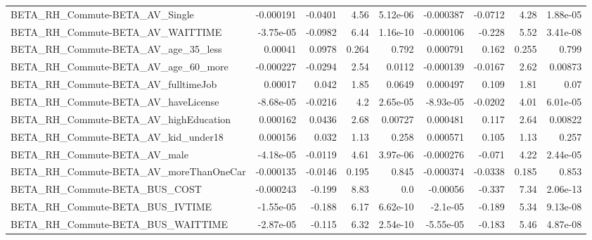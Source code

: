 \begin{tabular}{lrrrrrrrr}
BETA\_RH\_Commute-BETA\_AV\_Single                     &   -0.000191 &      -0.0401 &      4.56 & 5.12e-06 &  -0.000387 &     -0.0712 &         4.28 &      1.88e-05 \\
BETA\_RH\_Commute-BETA\_AV\_WAITTIME                   &   -3.75e-05 &      -0.0982 &      6.44 & 1.16e-10 &  -0.000106 &      -0.228 &         5.52 &      3.41e-08 \\
BETA\_RH\_Commute-BETA\_AV\_age\_35\_less                &     0.00041 &       0.0978 &     0.264 &    0.792 &   0.000791 &       0.162 &        0.255 &         0.799 \\
BETA\_RH\_Commute-BETA\_AV\_age\_60\_more                &   -0.000227 &      -0.0294 &      2.54 &   0.0112 &  -0.000139 &     -0.0167 &         2.62 &       0.00873 \\
BETA\_RH\_Commute-BETA\_AV\_fulltimeJob                &     0.00017 &        0.042 &      1.85 &   0.0649 &   0.000497 &       0.109 &         1.81 &          0.07 \\
BETA\_RH\_Commute-BETA\_AV\_haveLicense                &   -8.68e-05 &      -0.0216 &       4.2 & 2.65e-05 &  -8.93e-05 &     -0.0202 &         4.01 &      6.01e-05 \\
BETA\_RH\_Commute-BETA\_AV\_highEducation              &    0.000162 &       0.0436 &      2.68 &  0.00727 &   0.000481 &       0.117 &         2.64 &       0.00822 \\
BETA\_RH\_Commute-BETA\_AV\_kid\_under18                &    0.000156 &        0.032 &      1.13 &    0.258 &   0.000571 &       0.105 &         1.13 &         0.257 \\
BETA\_RH\_Commute-BETA\_AV\_male                       &   -4.18e-05 &      -0.0119 &      4.61 & 3.97e-06 &  -0.000276 &      -0.071 &         4.22 &      2.44e-05 \\
BETA\_RH\_Commute-BETA\_AV\_moreThanOneCar             &   -0.000135 &      -0.0146 &     0.195 &    0.845 &  -0.000374 &     -0.0338 &        0.185 &         0.853 \\
BETA\_RH\_Commute-BETA\_BUS\_COST                      &   -0.000243 &       -0.199 &      8.83 &      0.0 &   -0.00056 &      -0.337 &         7.34 &      2.06e-13 \\
BETA\_RH\_Commute-BETA\_BUS\_IVTIME                    &   -1.55e-05 &       -0.188 &      6.17 & 6.62e-10 &   -2.1e-05 &      -0.189 &         5.34 &      9.13e-08 \\
BETA\_RH\_Commute-BETA\_BUS\_WAITTIME                  &   -2.87e-05 &       -0.115 &      6.32 & 2.54e-10 &  -5.55e-05 &      -0.183 &         5.46 &      4.87e-08 \\

\end{tabular}
